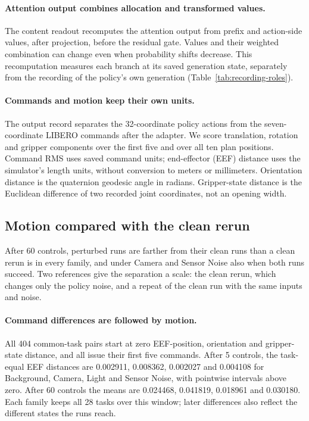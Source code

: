 \paragraph{Attention output combines allocation and transformed values.}
The content readout recomputes the attention output from prefix and action-side values, after projection, before the residual gate. Values and their weighted combination can change even when probability shifts decrease. This recomputation measures each branch at its saved generation state, separately from the recording of the policy's own generation (Table~\ref{tab:recording-roles}).

\paragraph{Commands and motion keep their own units.}
The output record separates the 32-coordinate policy actions from the seven-coordinate LIBERO commands after the adapter. We score translation, rotation and gripper components over the first five and over all ten plan positions. Command RMS uses saved command units; end-effector (EEF) distance uses the simulator's length units, without conversion to meters or millimeters. Orientation distance is the quaternion geodesic angle in radians. Gripper-state distance is the Euclidean difference of two recorded joint coordinates, not an opening width.

\subsection{Motion compared with the clean rerun}
\label{sec:plus-motion}
After 60 controls, perturbed runs are farther from their clean runs than a clean rerun is in every family, and under Camera and Sensor Noise also when both runs succeed. Two references give the separation a scale: the clean rerun, which changes only the policy noise, and a repeat of the clean run with the same inputs and noise.

\paragraph{Command differences are followed by motion.}
All 404 common-task pairs start at zero EEF-position, orientation and gripper-state distance, and all issue their first five commands. After 5 controls, the task-equal EEF distances are 0.002911, 0.008362, 0.002027 and 0.004108 for Background, Camera, Light and Sensor Noise, with pointwise intervals above zero. After 60 controls the means are 0.024468, 0.041819, 0.018961 and 0.030180. Each family keeps all 28 tasks over this window; later differences also reflect the different states the runs reach.

